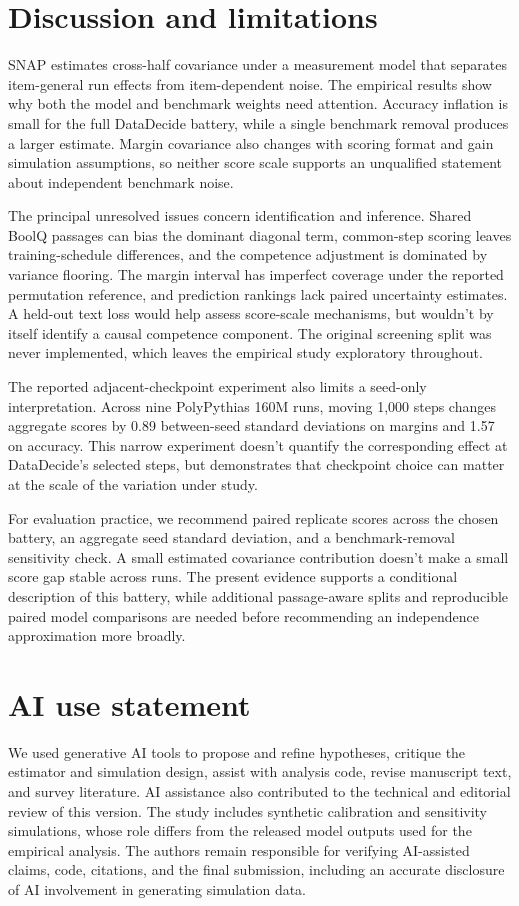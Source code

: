 \documentclass{article}
\begin{document}
\section{Discussion and limitations}
SNAP estimates cross-half covariance under a measurement model that separates item-general run effects from item-dependent noise. The empirical results show why both the model and benchmark weights need attention. Accuracy inflation is small for the full DataDecide battery, while a single benchmark removal produces a larger estimate. Margin covariance also changes with scoring format and gain simulation assumptions, so neither score scale supports an unqualified statement about independent benchmark noise.

The principal unresolved issues concern identification and inference. Shared BoolQ passages can bias the dominant diagonal term, common-step scoring leaves training-schedule differences, and the competence adjustment is dominated by variance flooring. The margin interval has imperfect coverage under the reported permutation reference, and prediction rankings lack paired uncertainty estimates. A held-out text loss would help assess score-scale mechanisms, but wouldn't by itself identify a causal competence component. The original screening split was never implemented, which leaves the empirical study exploratory throughout.

The reported adjacent-checkpoint experiment also limits a seed-only interpretation. Across nine PolyPythias 160M runs, moving 1,000 steps changes aggregate scores by 0.89 between-seed standard deviations on margins and 1.57 on accuracy. This narrow experiment doesn't quantify the corresponding effect at DataDecide's selected steps, but demonstrates that checkpoint choice can matter at the scale of the variation under study.

For evaluation practice, we recommend paired replicate scores across the chosen battery, an aggregate seed standard deviation, and a benchmark-removal sensitivity check. A small estimated covariance contribution doesn't make a small score gap stable across runs. The present evidence supports a conditional description of this battery, while additional passage-aware splits and reproducible paired model comparisons are needed before recommending an independence approximation more broadly.

\label{maintext:end}
\section*{AI use statement}
We used generative AI tools to propose and refine hypotheses, critique the estimator and simulation design, assist with analysis code, revise manuscript text, and survey literature. AI assistance also contributed to the technical and editorial review of this version. The study includes synthetic calibration and sensitivity simulations, whose role differs from the released model outputs used for the empirical analysis. The authors remain responsible for verifying AI-assisted claims, code, citations, and the final submission, including an accurate disclosure of AI involvement in generating simulation data.
\end{document}
